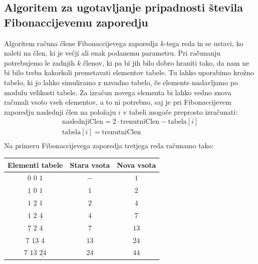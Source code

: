 \documentclass[10pt,a4paper,oneside]{book}
\begin{document}
\subsection{Algoritem za ugotavljanje pripadnosti števila Fibonaccijevemu zaporedju}
Algoritem računa člene Fibonaccijevega zaporedja $k$-tega reda in se ustavi, ko naleti na člen, ki je večji ali enak podanemu parametru. Pri računanju potrebujemo le zadnjih $k$ členov, ki pa bi jih bilo dobro hraniti tako, da nam ne bi bilo treba kakorkoli premetavati elementov tabele. Tu lahko uporabimo krožno tabelo, ki jo lahko simuliramo z navadno tabelo, če elemente naslavljamo po modulu velikosti tabele. Za izračun novega elementa bi lahko vedno znova računali vsoto vseh elementov, a to ni potrebno, saj je pri Fibonaccijevem zaporedju naslednji člen na položaju $i$ v tabeli mogoče preprosto izračunati:\\
\[\begin{array}{l}
\mbox{naslednjiClen} = 2\cdot\mbox{trenutniClen} - \mbox{tabela}[i]\\
\mbox{tabela}[i] = \mbox{trenutniClen}\\
\end{array}\]
Na primeru Fibonaccijevega zaporedja tretjega reda računamo tako:
\begin{center}
\begin{tabular}{c|c|c}
	Elementi tabele & Stara vsota & Nova vsota \\
	\hline
	$0$ $0$ $1$ & $-$ & $1$\\
	$\underline{1}$ $0$ $1$ & $1$ & $2$\\
	$1$ $\underline{2}$ $1$ & $2$ & $4$\\
	$1$ $2$ $\underline{4}$ & $4$ & $7$\\
	$\underline{7}$ $2$ $4$ & $7$ & $13$\\
	$7$ $\underline{13}$ $4$ & $13$ & $24$\\
	$7$ $13$ $\underline{24}$ & $24$ & $44$\\
\end{tabular}
\end{center}
\end{document}
